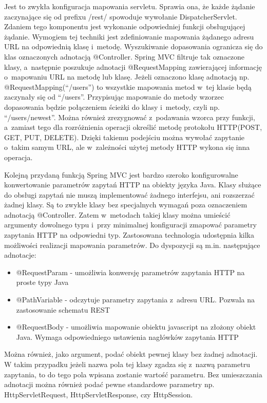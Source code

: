 Jest to zwykła konfiguracja mapowania servletu. Sprawia ona, że każde żądanie zaczynające się od prefixu /rest/ spowoduje wywołanie DispatcherServlet. Zdaniem tego komponentu jest wykonanie odpowiedniej funkcji obsługującej żądanie. Wymogiem tej techniki jest zdefiniowanie mapowania żądanego adresu URL na odpowiednią klasę i~metodę. Wyszukiwanie dopasowania ogranicza się do klas oznaczonych adnotacją @Controller. Spring MVC filtruje tak oznaczone klasy, a~następnie poszukuje adnotacji @RequestMapping zawierającej informację o~mapowaniu URL na metodę lub klasę. Jeżeli oznaczono klasę adnotacją np. @RequestMapping(“/users”) to wszystkie mapowania metod w~tej klasie będą zaczynały się od “/users”. Przypisując mapowanie do metody wzorzec dopasowania będzie połączeniem ścieżki do klasy i~metody, czyli np. “/users/newest”. Można również zrezygnować z~podawania wzorca przy funkcji, a~zamiast tego dla rozróżnienia operacji określić metodę protokołu HTTP(POST, GET, PUT, DELETE). Dzięki takiemu podejściu można wywołać zapytanie o~takim samym URL, ale w~zależności użytej metody HTTP wykona się inna operacja. 

Kolejną przydaną funkcją Spring MVC jest bardzo szeroko konfigurowalne konwertowanie parametrów zapytań HTTP na obiekty języka Java. Klasy służące do obsługi zapytań nie muszą implementować żadnego interfejsu, ani rozszerzać żadnej klasy. Są to zwykłe klasy bez specjalnych wymagań poza oznaczeniem adnotacją @Controller. Zatem w~metodach takiej klasy można umieścić argumenty dowolnego typu i~przy minimalnej konfiguracji zmapować parametry zapytania HTTP na odpowiedni typ. Zastosowana technologia udostępnia kilka możliwości realizacji mapowania parametrów. Do dyspozycji są m.in. następujące adnotacje:

\begin{itemize}
\item @RequestParam - umożliwia konwersję parametrów zapytania HTTP na proste typy Java
\item @PathVariable - odczytuje parametry zapytania z~adresu URL. Pozwala na zastosowanie schematu REST 
\item @RequestBody - umożliwia mapowanie obiektu javascript na złożony obiekt Java. Wymaga odpowiedniego ustawienia nagłówków zapytania HTTP
\end{itemize}

Można również, jako argument, podać obiekt pewnej klasy bez żadnej adnotacji. W takim przypadku jeżeli nazwa pola tej klasy zgadza się z~nazwą parametru zapytania, to do tego pola wpisana zostanie wartość parametru. Bez umieszczania adnotacji można również podać pewne standardowe parametry np. HttpServletRequest, HttpServletResponse, czy HttpSession\cite{springmvcWww}.

